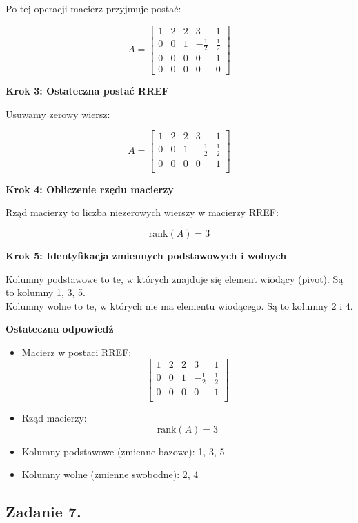\documentclass{article}
\begin{document}
Po tej operacji macierz przyjmuje postać:

\[
A =
\begin{bmatrix}
1 & 2 & 2 & 3 & 1 \\
0 & 0 & 1 & - \frac{1}{2} & \frac{1}{2} \\
0 & 0 & 0 & 0 & 1 \\
0 & 0 & 0 & 0 & 0
\end{bmatrix}
\]

\textbf{Krok 3: Ostateczna postać RREF}

Usuwamy zerowy wiersz:

\[
A =
\begin{bmatrix}
1 & 2 & 2 & 3 & 1 \\
0 & 0 & 1 & - \frac{1}{2} & \frac{1}{2} \\
0 & 0 & 0 & 0 & 1 \\
\end{bmatrix}
\]

\textbf{Krok 4: Obliczenie rzędu macierzy}

Rząd macierzy to liczba niezerowych wierszy w macierzy RREF:

\[
\text{rank}(A) = 3
\]

\textbf{Krok 5: Identyfikacja zmiennych podstawowych i wolnych}

Kolumny podstawowe to te, w których znajduje się element wiodący (pivot). Są to kolumny 1, 3, 5.\\
Kolumny wolne to te, w których nie ma elementu wiodącego. Są to kolumny 2 i 4.

\textbf{Ostateczna odpowiedź}

\begin{itemize}
    \item Macierz w postaci RREF:
    \[
\begin{bmatrix}
1 & 2 & 2 & 3 & 1 \\
0 & 0 & 1 & - \frac{1}{2} & \frac{1}{2} \\
0 & 0 & 0 & 0 & 1 \\
\end{bmatrix}
\]
    \item Rząd macierzy:
    \[
    \text{rank}(A) = 3
    \]
    \item Kolumny podstawowe (zmienne bazowe): 1, 3, 5
    \item Kolumny wolne (zmienne swobodne): 2, 4
\end{itemize}

\subsection{Zadanie 7.}
\end{document}
